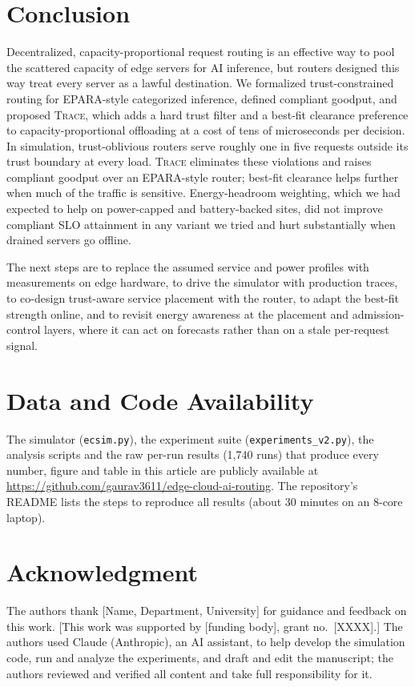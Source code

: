 \documentclass[journal]{IEEEtran}
\newcommand{\sys}{\textsc{Trace}}
\begin{document}
\section{Conclusion}\label{sec:conclusion}

Decentralized, capacity-proportional request routing is an effective way to pool the scattered capacity of edge servers for AI inference, but routers designed this way treat every server as a lawful destination. We formalized trust-constrained routing for EPARA-style categorized inference, defined compliant goodput, and proposed \sys{}, which adds a hard trust filter and a best-fit clearance preference to capacity-proportional offloading at a cost of tens of microseconds per decision. In simulation, trust-oblivious routers serve roughly one in five requests outside its trust boundary at every load. \sys{} eliminates these violations and raises compliant goodput over an EPARA-style router; best-fit clearance helps further when much of the traffic is sensitive. Energy-headroom weighting, which we had expected to help on power-capped and battery-backed sites, did not improve compliant SLO attainment in any variant we tried and hurt substantially when drained servers go offline.

The next steps are to replace the assumed service and power profiles with measurements on edge hardware, to drive the simulator with production traces, to co-design trust-aware service placement with the router, to adapt the best-fit strength online, and to revisit energy awareness at the placement and admission-control layers, where it can act on forecasts rather than on a stale per-request signal.

\section*{Data and Code Availability}
The simulator (\texttt{ecsim.py}), the experiment suite (\texttt{experiments\_v2.py}), the analysis scripts and the raw per-run results (1,740 runs) that produce every number, figure and table in this article are publicly available at \url{https://github.com/gaurav3611/edge-cloud-ai-routing}. The repository's README lists the steps to reproduce all results (about 30 minutes on an 8-core laptop).

\section*{Acknowledgment}
The authors thank [Name, Department, University] for guidance and feedback on this work. [This work was supported by [funding body], grant no.~[XXXX].] The authors used Claude (Anthropic), an AI assistant, to help develop the simulation code, run and analyze the experiments, and draft and edit the manuscript; the authors reviewed and verified all content and take full responsibility for it.
\end{document}
